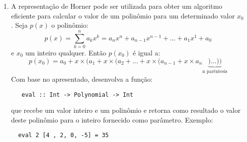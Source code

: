 \documentclass[10pt,a4paper]{report}
\begin{document}
\begin{enumerate}
\begin{verbatim}
   \end{verbatim}
   \item A representa\c{c}\~ao de Horner pode ser utilizada para obter um algoritmo eficiente para calcular o 
   valor de um polin\^omio para um determinado valor $x_{0}$. Seja $p(x)$ o polin\^omio:
\begin{equation*}
   p(x) = \sum_{k=0}^{n}a_{k}x^{k} = a_{n}x^{n} + a_{n - 1}x^{n - 1} + ... + a_{1}x^{1} + a_{0}
\end{equation*} 
e $x_{0}$ um inteiro qualquer. Ent\~ao $p(x_{0})$ \'e igual a:
\begin{equation*}
 p(x_{0}) = a_{0} + x \times (a_{1} + x \times (a_{2} + ... + x\times (a_{n - 1} + x\times a_{n}\underbrace{) ... ))}_{\text{n par\^entesis}}
\end{equation*}
Com base no apresentado, desenvolva a fun\c{c}\~ao:
\begin{verbatim}
   eval :: Int -> Polynomial -> Int
\end{verbatim}
que recebe um valor inteiro e um polin\^omio e retorna como resultado o valor deste polin\^omio para o inteiro
 fornecido como par\^ametro. Exemplo:
\begin{verbatim}
  eval 2 [4 , 2, 0, -5] = 35
\end{verbatim}
\end{enumerate}
\end{document}
